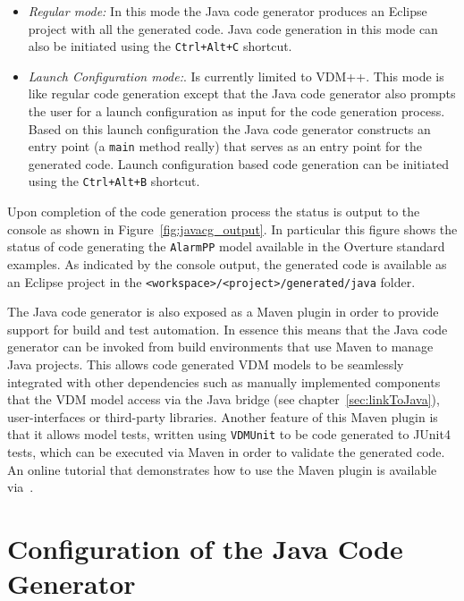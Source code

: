 \begin{itemize}

\item \emph{Regular mode:} In this mode the Java code generator
  produces an Eclipse project with all the generated code. Java code
  generation in this mode can also be initiated using the
  \texttt{Ctrl+Alt+C} shortcut.

\item \emph{Launch Configuration mode:}. Is currently limited to
  VDM++. This mode is like regular code generation except that the
  Java code generator also prompts the user for a launch configuration
  as input for the code generation process. Based on this launch
  configuration the Java code generator constructs an entry point (a
  \texttt{main} method really) that serves as an entry point for the
  generated code. Launch configuration based code generation can be
  initiated using the \texttt{Ctrl+Alt+B} shortcut.

\end{itemize}

\noindent Upon completion of the code generation process the status is
output to the console as shown in Figure~\ref{fig:javacg_output}. In
particular this figure shows the status of code generating the
\texttt{AlarmPP} model available in the Overture standard examples. As
indicated by the console output, the generated code is available as an
Eclipse project in the \texttt{<workspace>/<project>/generated/java}
folder.

\noindent The Java code generator is also exposed as a Maven plugin in
order to provide support for build and test automation. In essence
this means that the Java code generator can be invoked from build
environments that use Maven to manage Java projects. This allows code
generated VDM models to be seamlessly integrated with other
dependencies such as manually implemented components that the VDM
model access via the Java bridge (see chapter~\ref{sec:linkToJava}),
user-interfaces or third-party libraries. Another feature of this
Maven plugin is that it allows model tests, written using
\texttt{VDMUnit} to be code generated to JUnit4 tests, which can be
executed via Maven in order to validate the generated code. An online
tutorial that demonstrates how to use the Maven plugin is available
via~\cite{DelegateTutorial}.

\section{Configuration of the Java Code Generator}


